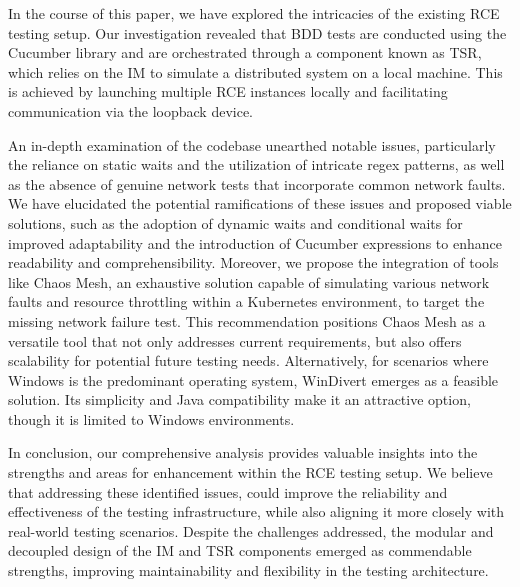 \label{sec:conclusion}
In the course of this paper, we have explored the intricacies of the existing RCE testing setup. Our investigation revealed that \acf{BDD} tests are conducted using the Cucumber library and are orchestrated through a component known as \acf{TSR}, which relies on the \acf{IM} to simulate a distributed system on a local machine. This is achieved by launching multiple RCE instances locally and facilitating communication via the loopback device. 

An in-depth examination of the codebase unearthed notable issues, particularly the reliance on static waits and the utilization of intricate regex patterns, as well as the absence of genuine network tests that incorporate common network faults. We have elucidated the potential ramifications of these issues and proposed viable solutions, such as the adoption of dynamic waits and conditional waits for improved adaptability and the introduction of Cucumber expressions to enhance readability and comprehensibility. Moreover, we propose the integration of tools like Chaos Mesh, an exhaustive solution capable of simulating various network faults and resource throttling within a Kubernetes environment, to target the missing network failure test. This recommendation positions Chaos Mesh as a versatile tool that not only addresses current requirements, but also offers scalability for potential future testing needs. Alternatively, for scenarios where Windows is the predominant operating system, WinDivert emerges as a feasible solution. Its simplicity and Java compatibility make it an attractive option, though it is limited to Windows environments. 

In conclusion, our comprehensive analysis provides valuable insights into the strengths and areas for enhancement within the RCE testing setup. We believe that addressing these identified issues, could improve the reliability and effectiveness of the testing infrastructure, while also aligning it more closely with real-world testing scenarios. Despite the challenges addressed, the modular and decoupled design of the \ac{IM} and \ac{TSR} components emerged as commendable strengths, improving maintainability and flexibility in the testing architecture.
